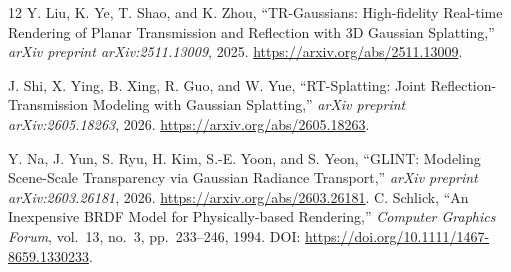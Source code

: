 \begin{thebibliography}{12}
Y. Liu, K. Ye, T. Shao, and K. Zhou,
``TR-Gaussians: High-fidelity Real-time Rendering of Planar Transmission and Reflection with 3D Gaussian Splatting,''
\emph{arXiv preprint arXiv:2511.13009}, 2025.
\url{https://arxiv.org/abs/2511.13009}.

J. Shi, X. Ying, B. Xing, R. Guo, and W. Yue,
``RT-Splatting: Joint Reflection-Transmission Modeling with Gaussian Splatting,''
\emph{arXiv preprint arXiv:2605.18263}, 2026.
\url{https://arxiv.org/abs/2605.18263}.

Y. Na, J. Yun, S. Ryu, H. Kim, S.-E. Yoon, and S. Yeon,
``GLINT: Modeling Scene-Scale Transparency via Gaussian Radiance Transport,''
\emph{arXiv preprint arXiv:2603.26181}, 2026.
\url{https://arxiv.org/abs/2603.26181}.
C. Schlick,
``An Inexpensive BRDF Model for Physically-based Rendering,''
\emph{Computer Graphics Forum}, vol.~13, no.~3, pp.~233--246, 1994.
DOI: \url{https://doi.org/10.1111/1467-8659.1330233}.

\end{thebibliography}
